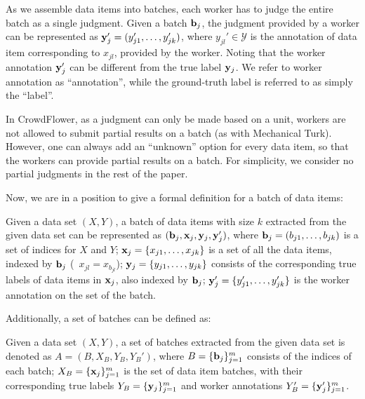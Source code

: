 
%

As we assemble data items into batches, 
each worker has to judge the entire batch as a single judgment.  
Given a batch ${\mathbf{b}}_j$, the judgment provided by a worker can be represented as ${\mathbf{y}}_j' = (y_{j1}', \ldots, y_{jk}')$, 
where $y_{jl}' \in \mathcal{Y}$ is the annotation of data item corresponding to 
$x_{jl}$, provided by the worker.
Noting that the worker annotation ${\mathbf{y}}_j'$ can be different from the true label ${\mathbf{y}}_j$.  
We refer to worker annotation as ``annotation'', while the ground-truth label is referred to 
as simply the ``label''.  

In CrowdFlower, as a judgment can only be made based on a unit,
workers are not allowed to submit partial results on a batch 
(as with Mechanical Turk).
However, one can always add an ``unknown'' option for every data item,
so that the workers can provide partial results on a batch.  
For simplicity, we consider no partial judgments in the rest of the paper.  

Now, we are in a position to give a formal definition for a batch of data items:
\begin{definition}
[Batch]
Given a data set $(X, Y)$,
a batch of data items with size $k$ extracted from the given data set can be represented as $({\mathbf{b}}_j, {\mathbf{x}}_j, {\mathbf{y}}_j, {\mathbf{y}}_j')$, 
where ${\mathbf{b}}_j = (b_{j1}, \ldots, b_{jk})$ is a set of indices for $X$ and $Y$; 
${\mathbf{x}}_j = \{x_{j1}, \ldots, x_{jk}\}$ is a set of all the data items, indexed by ${\mathbf{b}}_j$ (\ie~$x_{jl} = x_{b_{jl}}$); 
${\mathbf{y}}_j = \{y_{j1}, \ldots, y_{jk}\}$ consists of the corresponding true labels of data items in ${\mathbf{x}}_j$, also indexed by ${\mathbf{b}}_j$; 
${\mathbf{y}}_j' = \{y_{j1}', \ldots, y_{jk}'\}$ is the worker annotation on the set of the batch.  
\end{definition}

\noindent Additionally, a set of batches can be defined as:

\begin{definition}
Given a data set $(X, Y)$, 
a set of batches extracted from the given data set is denoted as $A = (B, X_B, Y_B, Y_B')$, 
where $B=\{{\mathbf{b}}_j\}_{j=1}^m$ consists of the indices of each batch; 
$X_B=\{{\mathbf{x}}_j\}_{j=1}^m$ is the set of data item batches, 
with their corresponding true labels $Y_B=\{{\mathbf{y}}_j\}_{j=1}^m$ 
and worker annotations $Y_B'=\{{\mathbf{y}}_j'\}_{j=1}^m$.  
\end{definition}

